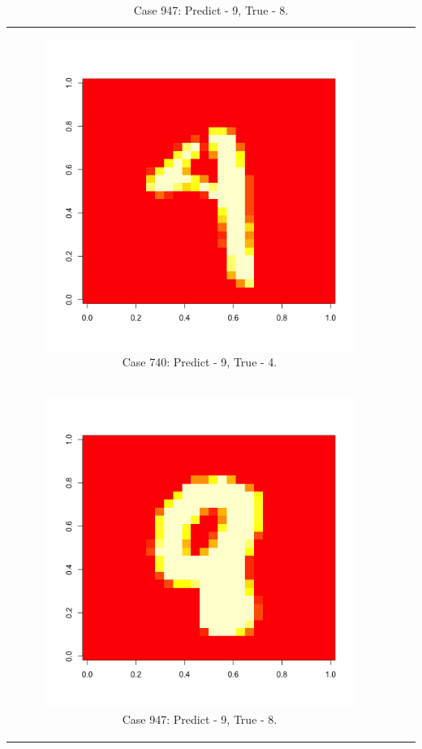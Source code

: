 \documentclass[10pt]{extarticle}
\begin{document}
\begin{table}{}
\begin{tabular}{c c c}
\begin{subfigure}{0.3\textwidth}\centering\includegraphics[scale = .25]{../Images/740.png}\caption{Case 740: Predict - 9, True - 4.}\label{fig:taba}\end{subfigure}\\
\newline
\begin{subfigure}{0.3\textwidth}\centering\includegraphics[scale = .25]{../Images/947.png}\caption{Case 947: Predict - 9, True - 8.}\label{fig:taba}\end{subfigure}&

\end{tabular}
\end{table}
\end{document}
